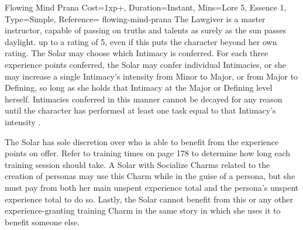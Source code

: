 \begin{Charm}{Flowing Mind Prana}{
    Cost=1xp+,
    Duration=Instant,
    Mins={Lore 5, Essence 1},
    Type=Simple,
    Reference=\cite*[p.~331]{ex3}
}{flowing-mind-prana}
    The Lawgiver is a master instructor, capable of passing on truths and
    talents as surely as the sun passes daylight.  up to a rating of 5, even if this
    puts the character beyond her own rating.  The
    Solar may choose which Intimacy is conferred. For each three experience
    points conferred, the Solar may confer individual Intimacies, or she may
    increase a single Intimacy’s intensity from Minor to Major, or from Major
    to Defining, so long as she holds that Intimacy at the Major or Defining
    level herself. Intimacies conferred in this manner cannot be decayed for
    any reason until the character has performed at least one task equal to
    that Intimacy’s intensity \parencite*[p.~215]{ex3}.

    The Solar has sole discretion over who is able to benefit from the
    experience points on offer. Refer to training times on page 178 to
    determine how long each training session should take.  A Solar with Socialize Charms related to the creation of
    personas may use this Charm while in the guise of a persona, but she must
    pay from both her main unspent experience total and the persona’s unspent
    experience total to do so. Lastly, the Solar cannot benefit from this or
    any other experience-granting training Charm in the same story in which she
    uses it to benefit someone else.
\end{Charm}




